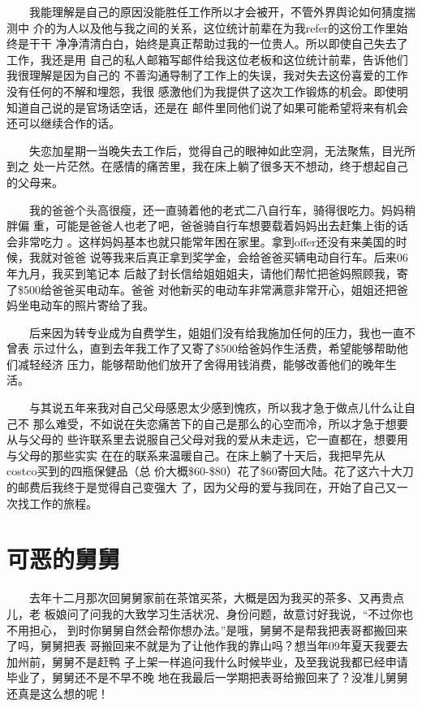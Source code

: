 \documentclass[12pt]{book}
\begin{document}
　　我能理解是自己的原因没能胜任工作所以才会被开，不管外界舆论如何猜度揣测中
介的为人以及他与我之间的关系，这位统计前辈在为我refer的这份工作里始终是干干
净净清清白白，始终是真正帮助过我的一位贵人。所以即使自己失去了工作，我还是用
自己的私人邮箱写邮件给我这位老板和这位统计前辈，告诉他们我很理解是因为自己的
不善沟通导制了工作上的失误，我对失去这份喜爱的工作没有任何的不解和埋怨，我很
感激他们为我提供了这次工作锻炼的机会。即使明知道自己说的是官场话空话，还是在
邮件里同他们说了如果可能希望将来有机会还可以继续合作的话。

　　失恋加星期一当晚失去工作后，觉得自己的眼神如此空洞，无法聚焦，目光所到之
处一片茫然。在感情的痛苦里，我在床上躺了很多天不想动，终于想起自己的父母来。

　　我的爸爸个头高很瘦，还一直骑着他的老式二八自行车，骑得很吃力。妈妈稍胖偏
重，可能是爸爸人也老了吧，爸爸骑自行车想要载着妈妈出去赶集上街的话会非常吃力
。这样妈妈基本也就只能常年困在家里。拿到offer还没有来美国的时候，我就对爸爸
说等我来后真正拿到奖学金，会给爸爸买辆电动自行车。后来06年九月，我买到笔记本
后敲了封长信给姐姐姐夫，请他们帮忙把爸妈照顾我，寄了\$500给爸爸买电动车。爸爸
对他新买的电动车非常满意非常开心，姐姐还把爸妈坐电动车的照片寄给了我。

　　后来因为转专业成为自费学生，姐姐们没有给我施加任何的压力，我也一直不曾表
示过什么，直到去年我工作了又寄了\$500给爸妈作生活费，希望能够帮助他们减轻经济
压力，能够帮助他们放开了舍得用钱消费，能够改善他们的晚年生活。

　　与其说五年来我对自己父母感恩太少感到愧疚，所以我才急于做点儿什么让自己不
那么难受，不如说在失恋痛苦下的自己是那么的心空而冷，所以才急于想要从与父母的
些许联系里去说服自己父母对我的爱从未走远，它一直都在，想要用与父母的那些实实
在在的联系来温暖自己。在床上躺了十天后，我把早先从costco买到的四瓶保健品（总
价大概\$60-\$80）花了\$60寄回大陆。花了这六十大刀的邮费后我终于是觉得自己变强大
了，因为父母的爱与我同在，开始了自己又一次找工作的旅程。
\section{可恶的舅舅}
\label{sec-8-20}

　　去年十二月那次回舅舅家前在茶馆买茶，大概是因为我买的茶多、又再贵点儿，老
板娘问了问我的大致学习生活状况、身份问题，故意讨好我说，“不过你也不用担心，
到时你舅舅自然会帮你想办法。”是哦，舅舅不是帮我把表哥都搬回来了吗，舅舅把表
哥搬回来不就是为了让他作我的靠山吗？想当年09年夏天我要去加州前，舅舅不是赶鸭
子上架一样追问我什么时候毕业，及至我说我都已经申请毕业了，舅舅还不是不早不晚
地在我最后一学期把表哥给搬回来了？没准儿舅舅还真是这么想的呢！
\end{document}
